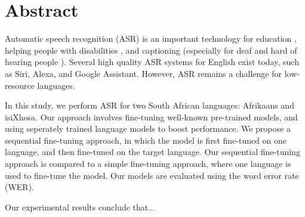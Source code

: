 \chapter*{Abstract}
\makeatletter{}\makeatother

Automatic speech recognition (ASR) is an important technology for education \cite{wald2005using}, 
helping people with disabilities \cite{terbeh2013automatic}, and captioning (especially for deaf and hard of hearing people \cite{wald2006captioning}).
Several high quality ASR systems for English exist today, such as Siri, Alexa, and Google Assistant. However, ASR remains a challenge for low-resource languages. 

In this study, we perform ASR for two South African languages: Afrikaans and isiXhosa.
Our approach involves fine-tuning well-known pre-trained models, and using seperately trained language models to boost performance.
We propose a sequential fine-tuning approach, in which the model is first fine-tuned on one language, and then fine-tuned on the target language.
Our sequential fine-tuning approach is compared to a simple fine-tuning approach, where one language is used to fine-tune the model.
Our models are evaluated using the word error rate (WER).

Our experimental results conclude that...



